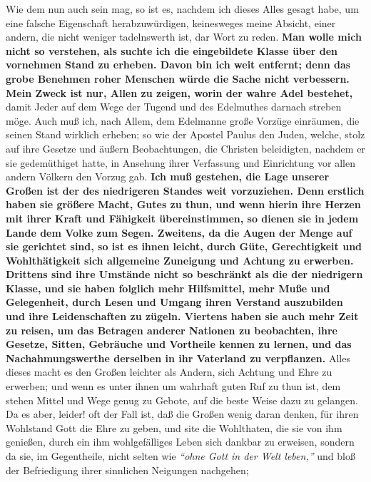 Wie dem nun auch sein mag, so ist es, nachdem ich dieses Alles gesagt habe, um
eine falsche Eigenschaft herabzuwürdigen, keinesweges meine Absicht, einer
andern, die nicht weniger tadelnswerth ist, dar Wort zu reden. \textbf{Man wolle
mich
nicht so verstehen, als suchte ich die eingebildete
Klasse über den vornehmen
Stand zu erheben. Davon bin ich weit entfernt; denn das grobe
Benehmen roher
Menschen würde die Sache nicht verbessern. Mein Zweck ist nur, Allen zu zeigen,
worin der wahre Adel bestehet,} damit Jeder auf dem Wege der Tugend und des
Edelmuthes darnach streben möge. Auch muß ich, nach Allem, dem Edelmanne große
Vorzüge einräumen, die seinen Stand wirklich erheben; so wie der Apostel
Paulus
den Juden, welche, stolz auf ihre Gesetze und äußern
Beobachtungen, die Christen
beleidigten, nachdem er sie gedemüthiget hatte, in Ansehung ihrer Verfassung und
Einrichtung vor allen andern Völkern den Vorzug gab. \textbf{Ich muß gestehen,
die Lage
unserer  Großen ist der des niedrigeren
Standes weit vorzuziehen. Denn erstlich
haben sie größere Macht, Gutes zu thun, und wenn hierin ihre Herzen mit ihrer
Kraft und Fähigkeit übereinstimmen, so dienen sie in jedem Lande dem Volke zum
Segen. Zweitens, da die Augen der Menge auf sie gerichtet sind, so ist es ihnen
leicht, durch Güte, Gerechtigkeit und Wohlthätigkeit sich
allgemeine Zuneigung
und Achtung zu erwerben. Drittens sind ihre Umstände nicht so beschränkt als die
der niedrigern Klasse, und sie haben folglich mehr Hilfsmittel, mehr
Muße und
Gelegenheit, durch Lesen und Umgang ihren Verstand
auszubilden und ihre
Leidenschaften zu zügeln. Viertens haben sie auch mehr Zeit zu
reisen, um das
Betragen anderer Nationen zu beobachten, ihre Gesetze, Sitten, Gebräuche und
Vortheile kennen zu lernen, und das Nachahmungswerthe derselben in ihr Vaterland
zu verpflanzen.} Alles dieses macht es den Großen leichter als Andern, sich
Achtung und Ehre zu erwerben; und wenn es unter ihnen um wahrhaft guten Ruf zu
thun ist, dem stehen Mittel und Wege genug zu Gebote, auf die beste Weise dazu
zu gelangen. Da es aber, leider! oft der Fall ist, daß die Großen wenig daran
denken, für ihren Wohlstand Gott die Ehre zu geben, und site die Wohlthaten, die
sie von ihm genießen, durch ein ihm wohlgefälliges Leben sich dankbar zu
erweisen, sondern da sie, im Gegentheile, nicht selten wie
\textit{"`ohne Gott in der
Welt leben,"'}  und bloß der Befriedigung ihrer sinnlichen Neigungen nachgehen;
